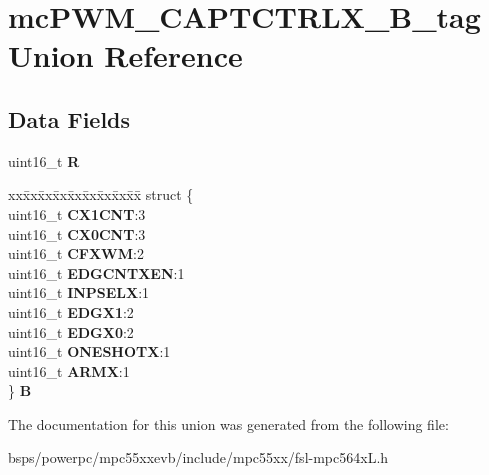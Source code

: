 \hypertarget{unionmcPWM__CAPTCTRLX__16B__tag}{}\section{mc\+P\+W\+M\+\_\+\+C\+A\+P\+T\+C\+T\+R\+L\+X\+\_\+B\+\_\+tag Union Reference}
\label{unionmcPWM__CAPTCTRLX__16B__tag}
\subsection*{Data Fields}
\begin{DoxyCompactItemize}
\item 
\mbox{\label{unionmcPWM__CAPTCTRLX__16B__tag_a3f4adc8f6dc809a1e2a1689b0bf3c5b2}} 
uint16\+\_\+t {\bfseries R}
\item 
\mbox{\label{unionmcPWM__CAPTCTRLX__16B__tag_ad4be15e0ccd59654bb1a6845b52b39b3}} 
\begin{tabbing}
xx\=xx\=xx\=xx\=xx\=xx\=xx\=xx\=xx\=\kill
struct \{\\
\>uint16\_t {\bfseries CX1CNT}:3\\
\>uint16\_t {\bfseries CX0CNT}:3\\
\>uint16\_t {\bfseries CFXWM}:2\\
\>uint16\_t {\bfseries EDGCNTXEN}:1\\
\>uint16\_t {\bfseries INPSELX}:1\\
\>uint16\_t {\bfseries EDGX1}:2\\
\>uint16\_t {\bfseries EDGX0}:2\\
\>uint16\_t {\bfseries ONESHOTX}:1\\
\>uint16\_t {\bfseries ARMX}:1\\
\} {\bfseries B}\\

\end{tabbing}\end{DoxyCompactItemize}


The documentation for this union was generated from the following file\+:\begin{DoxyCompactItemize}
\item 
bsps/powerpc/mpc55xxevb/include/mpc55xx/fsl-\/mpc564x\+L.\+h\end{DoxyCompactItemize}
